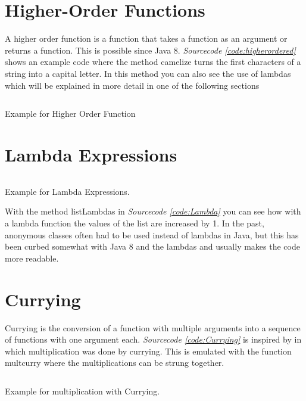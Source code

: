 \documentclass[a4paper,12pt,twoside]{scrreprt}
\begin{document}
\section{Higher-Order Functions}
A higher order function is a function that takes a function as an argument or returns a function. This is possible since Java 8. \emph{Sourcecode \ref{code:higherordered}} shows an example code where the method camelize turns the first characters of a string into a capital letter. In this method you can also see the use of lambdas which will be explained in more detail in one of the following sections
\begin{listing}[ht]
    \inputminted[fontsize=\footnotesize,linenos]{java}{./code/HigherOrderFunctions.java}
    \caption[Example for Higher Order Function]{Example for Higher Order Function}
    \label{code:higherordered}
\end{listing}
\clearpage

\section{Lambda Expressions}
\begin{listing}[ht]
    \inputminted[fontsize=\footnotesize,linenos]{java}{./code/Lambda.java}
    \caption[Example for Lambda]{Example for Lambda Expressions.}
    \label{code:Lambda}
\end{listing}
With the method listLambdas in \emph{Sourcecode \ref{code:Lambda}} you can see how with a lambda function the values of the list are increased by 1. In the past, anonymous classes often had to be used instead of lambdas in Java, but this has been curbed somewhat with Java 8 and the lambdas and usually makes the code more readable.
\clearpage
\section{Currying}
Currying is the conversion of a function with multiple arguments into a sequence of functions with one argument each. \emph{Sourcecode \ref{code:Currying}} is inspired by \cite{Robertson_currying_2018} in which multiplication was done by currying. This is emulated with the function multcurry where the multiplications can be strung together.
\begin{listing}[ht]
    \inputminted[fontsize=\footnotesize,linenos]{java}{./code/Currying.java}
    \caption[Example for Currying]{Example for multiplication with Currying.}
    \label{code:Currying}
\end{listing}
\clearpage
\end{document}
